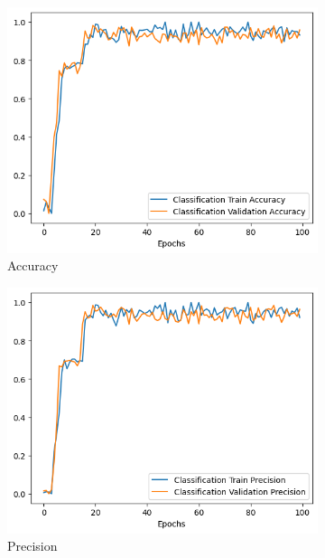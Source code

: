\begin{figure}[H]
    \centering
    \begin{subfigure}{0.3\textwidth}
        \includegraphics[width=\linewidth]{Images/Acc_5.png}
        \caption{Accuracy}
        \label{fig:Accuracy}
    \end{subfigure}
    \hfill
    \begin{subfigure}{0.3\textwidth}
        \includegraphics[width=\linewidth]{Images/Prec_5.png}
        \caption{Precision}
        \label{fig:Precision}
    \end{subfigure}
    \hfill
    \begin{subfigure}{0.3\textwidth}

\end{subfigure}
\end{figure}

